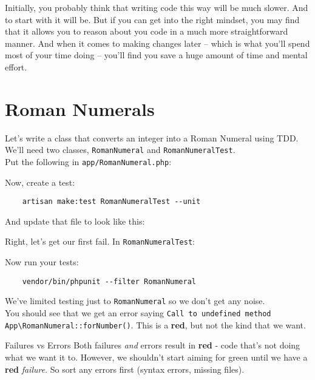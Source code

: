 Initially, you probably think that writing code this way will be much slower. And to start with it will be. But if you can get into the right mindset, you may find that it allows you to reason about you code in a much more straightforward manner. And when it comes to making changes later – which is what you'll spend most of your time doing – you'll find you save a huge amount of time and mental effort.

\section{Roman Numerals}

Let's write a class that converts an integer into a Roman Numeral using TDD.
\\

We'll need two classes, \texttt{RomanNumeral} and \texttt{RomanNumeralTest}.
\\

Put the following in \texttt{app/RomanNumeral.php}:



Now, create a test:

\begin{verbatim}
    artisan make:test RomanNumeralTest --unit
\end{verbatim}

And update that file to look like this:



Right, let's get our first fail. In \texttt{RomanNumeralTest}:


Now run your tests:

\begin{verbatim}
    vendor/bin/phpunit --filter RomanNumeral
\end{verbatim}

We've limited testing just to \texttt{RomanNumeral} so we don't get any noise.
\\

You should see that we get an error saying \texttt{Call to undefined method \\ App\textbackslash{}RomanNumeral::forNumber()}. This is a \textbf{red}, but not the kind that we want.

\begin{infobox}{Failures vs Errors}
    Both failures \textit{and} errors result in \textbf{red} - code that's not doing what we want it to. However, we shouldn't start aiming for green until we have a \textbf{red} \textit{failure}. So sort any errors first (syntax errors, missing files).
\end{infobox}

